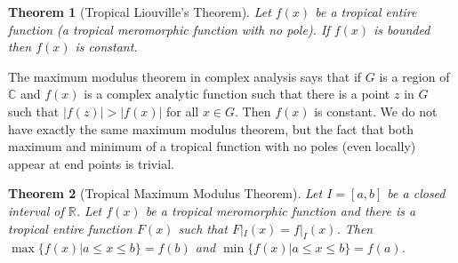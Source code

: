 \documentclass{amsart}
\newtheorem{thm}{Theorem}[section]
\theoremstyle{definition}
\theoremstyle{remark}
\begin{document}
\begin{thm}[Tropical Liouville's Theorem]
Let $f(x)$ be a tropical entire function (a tropical meromorphic function with no pole). If $f(x)$ is bounded then $f(x)$ is constant.
\end{thm}

The maximum modulus theorem in complex analysis says that if $G$ is a region of ${\mathbb{C}}$ and $f(x)$ is a complex analytic function such that there is a point $z$ in $G$ such that $|f(z)| > |f(x)|$ for all $x \in G$. Then $f(x)$ is constant. We do not have exactly the same maximum modulus theorem, but the fact that both maximum and minimum of a tropical function with no poles (even locally) appear at end points is trivial.

\begin{thm}[Tropical Maximum Modulus Theorem]
Let $I = [a,b]$ be a closed interval of ${\mathbb{R}}$. Let $f(x)$ be a tropical meromorphic function and there is a tropical entire function $F(x)$ such that $F|_I (x) = f|_I (x) $.  Then $\max \{ f(x) | a \leq x \leq  b \} = f(b)$ and $\min \{ f(x) | a \leq x \leq b \} = f(a)$.
\end{thm}



\end{document}
